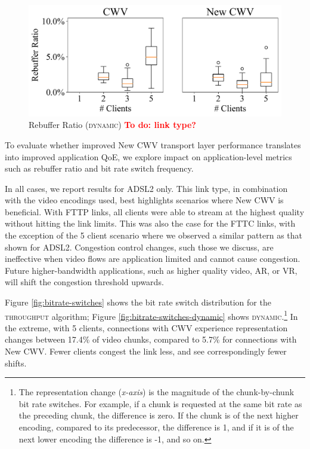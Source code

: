 \documentclass[10pt,sigconf]{acmart}
\newcommand{\todo}[1]{\textbf{\textcolor{red}{To do: #1}}}
\begin{document}
\begin{figure}
    \includegraphics[width=.45\textwidth, keepaspectratio]{figures/Rebuffer_Ratio_dynamic.pdf}
    \caption{Rebuffer Ratio (\textsc{dynamic}) \todo{link type?}}
    \label{fig:rebuffer-ratio-dynamic}
\end{figure}

To evaluate whether improved New CWV transport layer performance translates into improved application QoE, we explore impact on application-level metrics such as rebuffer ratio and bit rate switch frequency. 

In all cases, we report results for ADSL2 only. This link type, in combination with the video encodings used, best highlights scenarios where New CWV is beneficial. With FTTP links, all clients were able to stream at the highest quality without hitting the link limits. This was also the case for the FTTC links, with the exception of the 5 client scenario where we observed a similar pattern as that shown for ADSL2. Congestion control changes, such those we discuss, are ineffective when video flows are application limited and cannot cause congestion. Future higher-bandwidth applications, such as higher quality video, AR, or VR, will shift the congestion threshold upwards.

Figure \ref{fig:bitrate-switches} shows the bit rate switch distribution for the \textsc{throughput} algorithm; Figure \ref{fig:bitrate-switches-dynamic} shows \textsc{dynamic}.\footnote{The representation change (\emph{x-axis}) is the magnitude of the chunk-by-chunk bit rate switches. For example, if a chunk is requested at the same bit rate as the preceding chunk, the difference is zero. If the chunk is of the next higher encoding, compared to its predecessor, the difference is 1, and if it is of the next lower encoding the difference is -1, and so on.} 
In the extreme, with 5 clients, connections with CWV experience representation changes between 17.4\% of video chunks, compared to 5.7\% for connections with New CWV. Fewer clients congest the link less, and see correspondingly fewer shifts.
\end{document}
